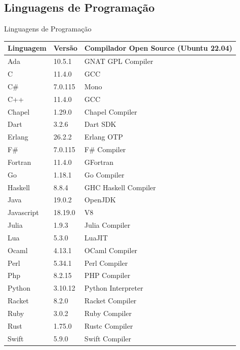 \subsection{Linguagens de Programação}
\begin{frame}{Linguagens de Programação}
    \begin{table}[h]
        \centering
        \fontsize{6}{7}\selectfont
        \begin{tabular}{l|l|l}
            \textbf{Linguagem} & \textbf{Versão} & \textbf{Compilador Open Source (Ubuntu 22.04)}\\
            \hline
            Ada & 10.5.1 & GNAT GPL Compiler \\
            \hline
            C & 11.4.0 & GCC \\
            \hline
            C\# & 7.0.115 & Mono \\
            \hline
            C++ & 11.4.0 & GCC \\
            \hline
            Chapel & 1.29.0 & Chapel Compiler \\
            \hline
            Dart & 3.2.6 & Dart SDK \\
            \hline
            Erlang &  26.2.2 & Erlang OTP \\
            \hline
            F\# & 7.0.115 & F\# Compiler \\
            \hline
            Fortran & 11.4.0 & GFortran \\
            \hline
            Go & 1.18.1 & Go Compiler \\
            \hline
            Haskell & 8.8.4 & GHC Haskell Compiler \\
            \hline
            Java & 19.0.2 & OpenJDK \\
            \hline
            Javascript & 18.19.0 & V8 \\
            \hline
            Julia & 1.9.3 & Julia Compiler \\
            \hline
            Lua & 5.3.0 & LuaJIT \\
            \hline
            Ocaml & 4.13.1 & OCaml Compiler \\
            \hline
            Perl & 5.34.1 & Perl Compiler \\
            \hline
            Php & 8.2.15 & PHP Compiler \\
            \hline
            Python & 3.10.12 & Python Interpreter \\
            \hline
            Racket & 8.2.0 & Racket Compiler \\
            \hline
            Ruby & 3.0.2 & Ruby Compiler \\
            \hline
            Rust & 1.75.0 & Rustc Compiler \\
            \hline
            Swift & 5.9.0 & Swift Compiler \\
        \end{tabular}
    \end{table}
\end{frame}

